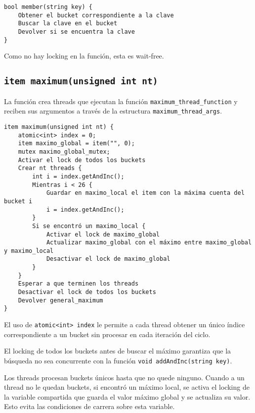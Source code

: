 \begin{verbatim}
bool member(string key) {
	Obtener el bucket correspondiente a la clave
	Buscar la clave en el bucket
	Devolver si se encuentra la clave
}
\end{verbatim}

Como no hay locking en la función, esta es wait-free.


\subsection{\texttt{item maximum(unsigned int nt)}}

La función crea threads que ejecutan la función \texttt{maximum_thread_function} y reciben sus argumentos a través de la estructura \texttt{maximum_thread_args}.

\begin{verbatim}
item maximum(unsigned int nt) {
	atomic<int> index = 0;
	item maximo_global = item("", 0);
	mutex maximo_global_mutex;
	Activar el lock de todos los buckets
	Crear nt threads {
		int i = index.getAndInc();
		Mientras i < 26 {
			Guardar en maximo_local el item con la máxima cuenta del bucket i
			i = index.getAndInc();
		}
		Si se encontró un maximo_local {
			Activar el lock de maximo_global
			Actualizar maximo_global con el máximo entre maximo_global y maximo_local
			Desactivar el lock de maximo_global
		}
	}
	Esperar a que terminen los threads
	Desactivar el lock de todos los buckets
	Devolver general_maximum
}
\end{verbatim}

El uso de \texttt{atomic<int> index} le permite a cada thread obtener un único índice correspondiente a un bucket sin procesar en cada iteración del ciclo.

El locking de todos los buckets antes de buscar el máximo garantiza que la búsqueda no sea concurrente con la función \texttt{void addAndInc(string key)}.

Los threads procesan buckets únicos hasta que no quede ninguno. Cuando a un thread no le quedan buckets, si encontró un máximo local, se activa el locking de la variable compartida que guarda el valor máximo global y se actualiza su valor. Esto evita las condiciones de carrera sobre esta variable.